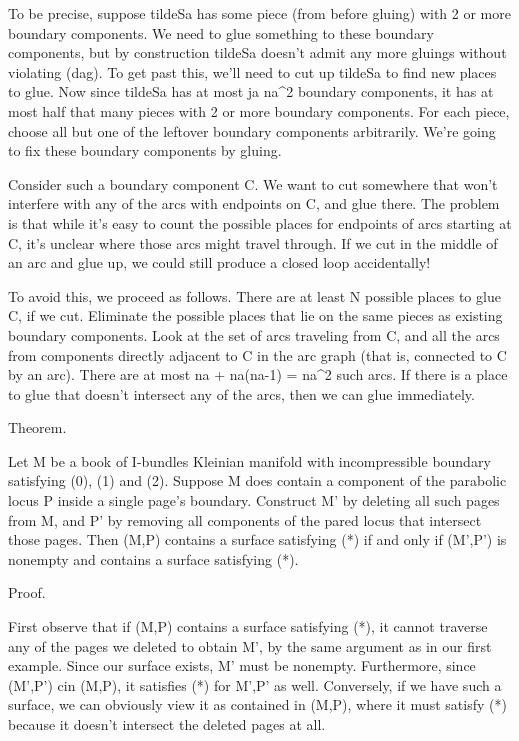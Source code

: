 \documentclass[12pt]{amsart}
\theoremstyle{definition}
\theoremstyle{remark}
\begin{document}
To be precise, suppose tildeSa has some piece (from before gluing) with 2 or
more boundary components. We need to glue something to these boundary
components, but by construction tildeSa doesn't admit any more gluings without
violating (dag). To get past this, we'll need to cut up tildeSa to find new
places to glue. Now since tildeSa has at most ja na^2 boundary components, it
has at most half that many pieces with 2 or more boundary components. For each
piece, choose all but one of the leftover boundary components arbitrarily.
We're going to fix these boundary components by gluing.

Consider such a boundary component C. We want to cut somewhere that won't
interfere with any of the arcs with endpoints on C, and glue there. The problem
is that while it's easy to count the possible places for endpoints of arcs
starting at C, it's unclear where those arcs might travel through. If we cut in
the middle of an arc and glue up, we could still produce a closed loop
accidentally!

To avoid this, we proceed as follows. There are at least N possible places to
glue C, if we cut. Eliminate the possible places that lie on the same pieces as
existing boundary components. Look at the set of arcs traveling from C, and all
the arcs from components directly adjacent to C in the arc graph (that is,
connected to C by an arc). There are at most na + na(na-1) = na^2 such arcs.
If there is a place to glue that doesn't intersect any of the arcs, then we can
glue immediately.

Theorem.

Let M be a book of I-bundles Kleinian manifold with incompressible boundary
satisfying (0), (1) and (2). Suppose M does contain a component of the
parabolic locus P inside a single page's boundary. Construct M' by deleting all
such pages from M, and P' by removing all components of the pared locus that
intersect those pages. Then (M,P) contains a surface satisfying (*) if and only
if (M',P') is nonempty and contains a surface satisfying (*).

Proof.

First observe that if (M,P) contains a surface satisfying (*), it cannot
traverse any of the pages we deleted to obtain M', by the same argument as in
our first example.  Since our surface exists, M' must be nonempty.
Furthermore, since (M',P') cin (M,P), it satisfies (*) for M',P' as well.
Conversely, if we have such a surface, we can obviously view it as contained in
(M,P), where it must satisfy (*) because it doesn't intersect the deleted pages
at all.
\end{document}
